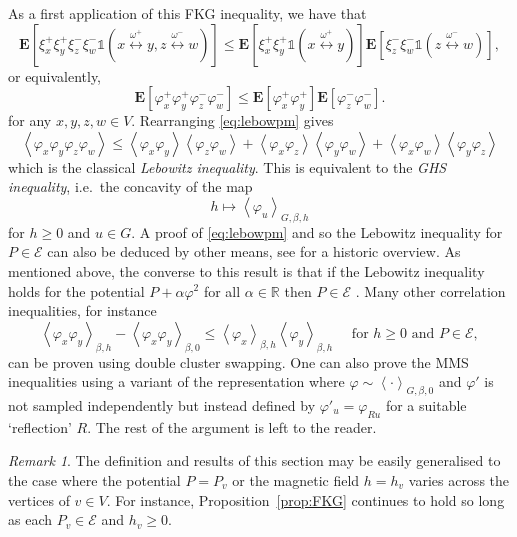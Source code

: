 \documentclass{article}
\numberwithin{equation}{section}
\theoremstyle{definition}
\theoremstyle{definition}
\theoremstyle{remark}
\newtheorem{remark}{Remark}
\newcommand{\E}{\mathbb{E}}
\newcommand\vp{\varphi}
\newcommand\Ec{\mathcal{E}}
\newcommand\R{\mathbb{R}}
\newcommand{\w}{\omega}
\renewcommand{\E}{\mathrm{\mathbf{E}}}
\renewcommand{\L}{\xi}
\renewcommand{\i}{\mathds{1}}
\begin{document}
\noindent As a first application of this FKG inequality, we have that
\begin{equation}\label{eq:lebowpm1}
\E[ \L^+_x \L^+_y \L^-_z \L^-_w \i(x \overset{\w^+}{\longleftrightarrow} y, z \overset{\w^-}{\longleftrightarrow} w) ] \leq \E[ \L^+_x \L^+_y \i(x \overset{\w^+}{\longleftrightarrow} y )] \E [ \L^-_z \L^-_w \i(z \overset{\w^-}{\longleftrightarrow} w) ],
\end{equation} 
or equivalently,
\begin{equation}\label{eq:lebowpm}
\E[ \vp^+_x \vp^+_y \vp^-_z \vp^-_w ] \leq \E[ \vp^+_x \vp^+_y ] \E[ \vp^-_z \vp^-_w ].
\end{equation} 
for any $x,y,z,w \in V$. Rearranging \eqref{eq:lebowpm} gives 
\begin{equation}\label{eq:lebow}
	\left< \vp_x \vp_y \vp_z \vp_w \right> \leq \left< \vp_x \vp_y  \right> \left< \vp_z \vp_w \right> + \left<\vp_x \vp_z \right> \left<\vp_y \vp_w \right> + \left<\vp_x \vp_w \right>\left<\vp_y \vp_z \right>
\end{equation}
which is the classical \emph{Lebowitz inequality}. This is equivalent to the \emph{GHS inequality}, i.e.~the concavity of the map 
\[
h \mapsto \left< \vp_u \right>_{G,\beta,h}
\] 
for $h \geq 0$ and $u \in G$. 
A proof of \eqref{eq:lebowpm} and so the Lebowitz inequality for $P \in \Ec$ 
can also be deduced by other means, see \cite{simon2026phase} for a historic overview.
As mentioned above, the converse to this result is that if the Lebowitz inequality holds for the potential $P + \alpha \vp^2$ for all $\alpha \in \R$ then $P \in \Ec$ \cite[Theorem 2]{newman1976rigorous}. 
Many other correlation inequalities, for instance
\[
\left< \vp_x \vp_y \right>_{\beta,h}^{} - \left< \vp_x \vp_y \right>_{\beta,0}^{} \leq \left< \vp_x \right>_{\beta,h} \left< \vp_y  \right>_{\beta,h}^{} \quad \text{ for }h \geq 0 \text{ and }P \in \Ec,
\] 
can be proven using double cluster swapping. One can also prove the MMS inequalities \cite{MMS} using a variant of the representation where $\vp \sim \left< \cdot \right>_{G,\beta,0}^{}$ and $\vp'$ is not sampled independently but instead defined by $\vp'_u = \vp_{Ru}$ for a suitable `reflection' $R$. The rest of the argument is left to the reader. 
\begin{remark}
	The definition and results of this section may be easily generalised to the case where the potential $P = P_v$ or the magnetic field $h = h_v$ varies across the vertices of $v \in V$. For instance, Proposition~\ref{prop:FKG} continues to hold so long as each $P_v \in \Ec$ and $h_v \geq 0$.
\end{remark}
\end{document}
